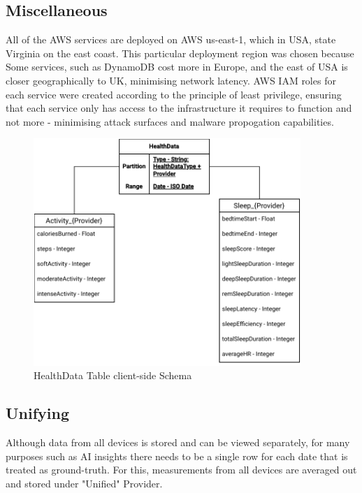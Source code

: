 \subsection{Miscellaneous}
All of the AWS services are deployed on AWS us-east-1, which in USA, state Virginia on the east coast. This particular deployment region was chosen because Some services, such as DynamoDB cost more in Europe, and the east of USA is closer geographically to UK, minimising network latency. AWS IAM roles for each service were created according to the principle of least privilege, ensuring that each service only has access to the infrastructure it requires to function and not more - minimising attack surfaces and malware propogation capabilities.
\begin{figure}
    
    \centering
    \includegraphics[width=0.9\textwidth,height=\textheight,keepaspectratio]{../images/dataSchema.pdf}
    \caption{HealthData Table client-side Schema}
    \label{fig:schema}
    
\end{figure}
\subsection{Unifying}
Although data from all devices is stored and can be viewed separately, for many purposes such as AI insights there needs to be a single row for each date that is treated as ground-truth. For this, measurements from all devices are averaged out and stored under "Unified" Provider. 
